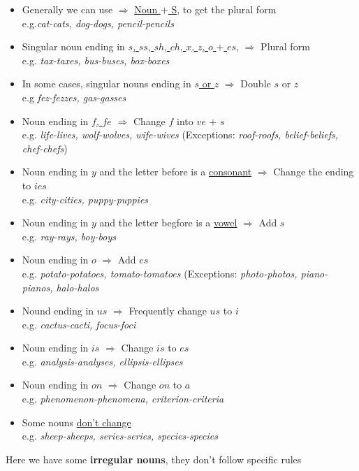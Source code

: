 \documentclass[hidelinks,10pt,a4paper]{article}
\begin{document}
\begin{itemize}
		\item Generally we can use $\Rightarrow$ \underline{Noun $+$ S}, to get the plural form \\e.g.\textit{cat-cats, dog-dogs, pencil-pencils}
		\item Singular noun ending in \underline{$s$, $ss$, $sh$, $ch$, $x$, $z$, $o$ $+$ $es$}, $\Rightarrow$ Plural form \\ e.g. \textit{ tax-taxes, bus-buses, box-boxes}
		\item In some cases, singular nouns ending in \underline{$s$ or $z$} $\Rightarrow$ Double $s$ or $z$ \\
			e.g \textit{fez-fezzes, gas-gasses}
		\item Noun ending in \underline{$f$, $fe$} $\Rightarrow$ Change $f$ into $ve$ $+$ $s$ \\e.g. \textit{life-lives, wolf-wolves, wife-wives} \quad (Exceptions: \textit{roof-roofs, belief-beliefs, chef-chefs})
		\item Noun ending in $y$ and the letter before is a \underline{consonant} $\Rightarrow$ Change the ending to $ies$ \\
			e.g. \textit{city-cities, puppy-puppies}
		\item Noun ending in $y$ and the letter begfore is a \underline{vowel} $\Rightarrow$ Add $s$ \\
			e.g. \textit{ray-rays, boy-boys}
		\item Noun ending in $o$ $\Rightarrow$ Add $es$ \\
			e.g. \textit{potato-potatoes, tomato-tomatoes} \quad (Exceptions: \textit{photo-photos, piano-pianos, halo-halos}
		\item Nound ending in $us$ $\Rightarrow$ Frequently change $us$ to $i$ \\
			e.g. \textit{cactus-cacti, focus-foci}
		\item Noun ending in $is$ $\Rightarrow$ Change $is$ to $es$ \\
			e.g. \textit{analysis-analyses, ellipsis-ellipses}
		\item Noun ending in $on$ $\Rightarrow$ Change $on$ to $a$ \\
			e.g. \textit{phenomenon-phenomena, criterion-criteria}
		\item Some nouns \underline{don't change} \\
			e.g. \textit{sheep-sheeps, series-series, species-species}
\end{itemize}
Here we have some \textbf{irregular nouns}, they don't follow specific rules\\
\end{document}
